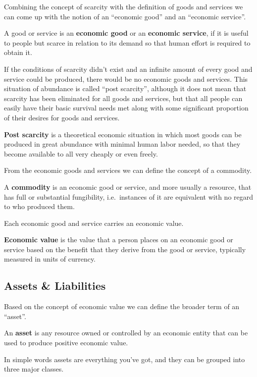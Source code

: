 Combining the concept of scarcity with the definition of goods and services we can come up with the notion of an
``economic good'' and an ``economic service''.

A good or service is an \textbf{economic good} or an \textbf{economic service}, if it is useful to people but scarce in
relation to its demand so that human effort is required to obtain it.
\ed

If the conditions of scarcity didn't exist and an infinite amount of every good and service could be produced, there
would be no economic goods and services. This situation of abundance is called ``post scarcity'', although it does
not mean that scarcity has been eliminated for all goods and services, but that all people can easily have their
basic survival needs met along with some significant proportion of their desires for goods and services.

\textbf{Post scarcity} is a theoretical economic situation in which most goods can be produced in great abundance
with minimal human labor needed, so that they become available to all very cheaply or even freely.
\ed

From the economic goods and services we can define the concept of a commodity.

\bd[Commodity]
A \textbf{commodity} is an economic good or service, and more usually a resource, that has full or substantial
fungibility, i.e.\ instances of it are equivalent with no regard to who produced them.
\ed

Each economic good and service carries an economic value.

\textbf{Economic value} is the value that a person places on an economic good or service based on the benefit that they
derive from the good or service, typically measured in units of currency.
\ed

\subsection{Assets \& Liabilities}

Based on the concept of economic value we can define the broader term of an ``asset''.

\bd[Asset] \label{def:asset}
An \textbf{asset} is any resource owned or controlled by an economic entity that can be used to produce positive
economic value.
\ed

In simple words assets are everything you've got, and they can be grouped into three major classes.

